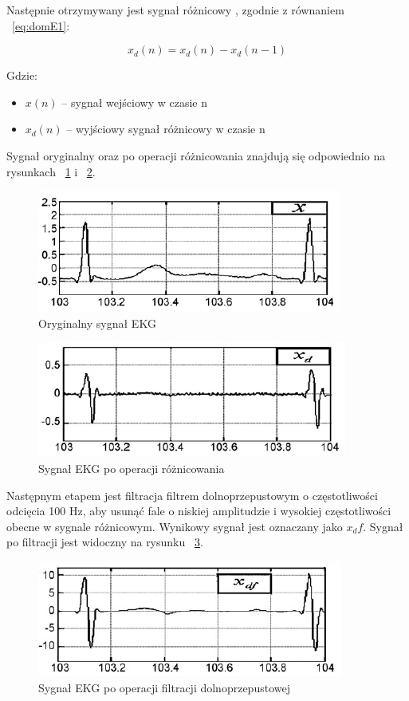 \documentclass[10pt,a4paper]{article}
\begin{document}
Następnie otrzymywany jest sygnał różnicowy , zgodnie z równaniem ~\ref{eq:domE1}:

\begin{equation} \label{eq:domE1}
	x_d(n)=x_d(n)-x_d(n-1)
\end{equation}

Gdzie:

\begin{itemize}
	\item $x(n)$ – sygnał wejściowy w czasie n
	\item $x_d(n)$ – wyjściowy sygnał różnicowy w czasie n
\end{itemize}

Sygnał oryginalny oraz po operacji różnicowania znajdują się odpowiednio na rysunkach ~\ref{fig:dom1} i ~\ref{fig:dom2}.

\begin{figure}
  	\centering
    \includegraphics{dom1}
    \caption{Oryginalny sygnał EKG}
  	\label{fig:dom1}
\end{figure}

\begin{figure}
  	\centering
    \includegraphics{dom2}
    \caption{Sygnał EKG po operacji różnicowania}
  	\label{fig:dom2}
\end{figure}

Następnym etapem jest filtracja filtrem dolnoprzepustowym o częstotliwości odcięcia 100 Hz, aby usunąć fale o niskiej amplitudzie i wysokiej częstotliwości obecne w sygnale różnicowym. Wynikowy sygnał jest oznaczany jako $x_df$. Sygnał po filtracji jest widoczny na rysunku ~\ref{fig:dom3}.

\begin{figure}
  	\centering
    \includegraphics{dom3}
    \caption{Sygnał EKG po operacji filtracji dolnoprzepustowej}
  	\label{fig:dom3}
\end{figure}
\end{document}
